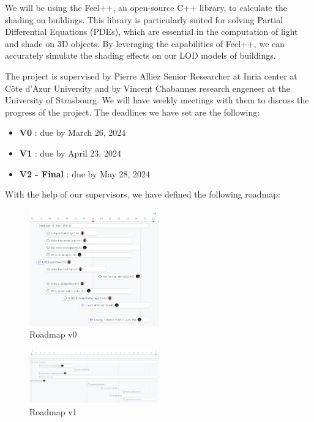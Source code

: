 \documentclass[12pt]{article}
\begin{document}
We will be using the Feel++, an open-source C++ library, to calculate the
shading on buildings. This library is particularly suited for solving
Partial Differential Equations (PDEs), which are essential in the computation
of light and shade on 3D objects\cite{feel++}. By leveraging the capabilities of Feel++,
we can accurately simulate the shading effects on our LOD models of buildings.

The project is supervised by Pierre Alliez
Senior Researcher at Inria center at Côte d'Azur University
and by Vincent Chabannes research engeneer at the University of Strasbourg.
We will have weekly meetings with them to discuss the progress of the project.
The deadlines we have set are the following:
\begin{itemize}
    \item \textbf{V0} : due by March 26, 2024
    \item \textbf{V1} : due by April 23, 2024
    \item \textbf{V2 - Final} : due by May 28, 2024
\end{itemize}

With the help of our supervisors, we have defined the following roadmap:

\begin{figure}[H]
    \centering
    \includegraphics[width=0.5\textwidth]{images/roadmap_v0.png}
    \caption{Roadmap v0}
\end{figure}

\begin{figure}[H]
    \centering
    \includegraphics[width=0.5\textwidth]{images/roadmap_v1.png}
    \caption{Roadmap v1}
\end{figure}
\end{document}
